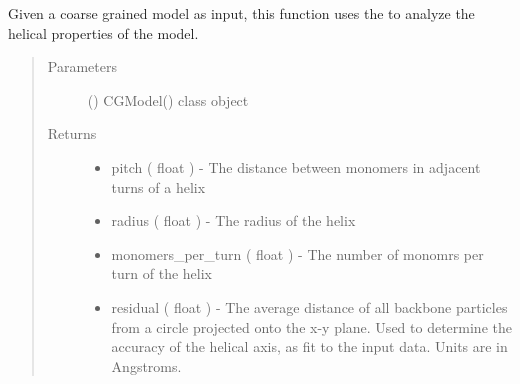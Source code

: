 \documentclass[letterpaper,12pt,english,openany,oneside]{sphinxmanual}
\begin{document}

\begin{fulllineitems}
\label{\detokenize{parameters:parameters.secondary_structure.get_helical_data}}
\end{fulllineitems}


\begin{fulllineitems}
\label{\detokenize{parameters:parameters.secondary_structure.get_helical_parameters}}
Given a coarse grained model as input, this function uses the  to analyze the helical properties of the model.
\begin{quote}\begin{description}
\item[{Parameters}] \leavevmode
{} () \textendash{} CGModel() class object

\item[{Returns}] \leavevmode
\begin{itemize}
\item {} 
pitch ( float ) - The distance between monomers in adjacent turns of a helix

\item {} 
radius ( float ) - The radius of the helix

\item {} 
monomers\_per\_turn ( float ) - The number of monomrs per turn of the helix

\item {} 
residual ( float ) - The average distance of all backbone particles from a circle projected onto the x-y plane.  Used to determine the accuracy of the helical axis, as fit to the input data.  Units are in Angstroms.


\end{itemize}
\end{description}
\end{quote}
\end{fulllineitems}
\end{document}
